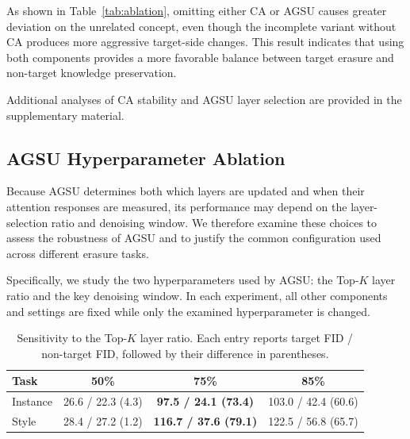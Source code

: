 \documentclass[letterpaper]{article} %
\begin{document}
As shown in Table~\ref{tab:ablation}, omitting either CA or AGSU causes greater deviation on the unrelated concept, even though the incomplete variant without CA produces more aggressive target-side changes. This result indicates that using both components provides a more favorable balance between target erasure and non-target knowledge preservation.

Additional analyses of CA stability and AGSU layer selection are provided in the supplementary material.


\subsection{AGSU Hyperparameter Ablation}

Because AGSU determines both which layers are updated and when their attention responses are measured, its performance may depend on the layer-selection ratio and denoising window. We therefore examine these choices to assess the robustness of AGSU and to justify the common configuration used across different erasure tasks.

Specifically, we study the two hyperparameters used by AGSU: the Top-$K$ layer ratio and the key denoising window. In each experiment, all other components and settings are fixed while only the examined hyperparameter is changed.

\begin{table}[t]
\centering
\small
\setlength{\tabcolsep}{3.5pt}
\caption{Sensitivity to the Top-$K$ layer ratio. Each entry reports target FID / non-target FID, followed by their difference in parentheses.}
\label{tab:app-agsu-topk}
\begin{tabular}{lccc}
\toprule
Task & 50\% & 75\% & 85\% \\
\midrule
Instance
& 26.6 / 22.3 (4.3)
& \textbf{97.5 / 24.1 (73.4)}
& 103.0 / 42.4 (60.6) \\
Style
& 28.4 / 27.2 (1.2)
& \textbf{116.7 / 37.6 (79.1)}
& 122.5 / 56.8 (65.7) \\
\bottomrule
\end{tabular}
\end{table}
\end{document}
